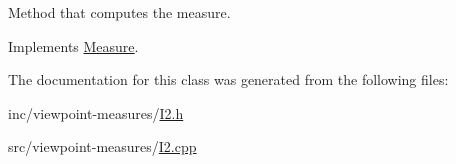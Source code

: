 Method that computes the measure. 



Implements \hyperlink{class_measure_aed88fe46b2a609ab5948e5f3c891321d}{Measure}.



The documentation for this class was generated from the following files\+:\begin{DoxyCompactItemize}
\item 
inc/viewpoint-\/measures/\hyperlink{_i2_8h}{I2.\+h}\item 
src/viewpoint-\/measures/\hyperlink{_i2_8cpp}{I2.\+cpp}\end{DoxyCompactItemize}

